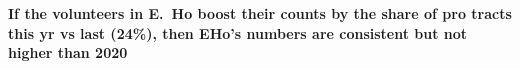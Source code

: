\documentclass[11pt]{article}
\def\bfr{\bf\color{red}}
\def\selah{SELAH}
\begin{document}
{\bfr If the volunteers in E.~Ho boost their counts by the share of pro tracts this yr vs last (24\%), then
EHo's numbers are consistent but not higher than 2020}

%
%
%


\clearpage

\end{document}
